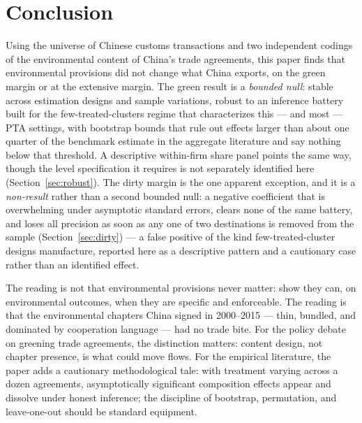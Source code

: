 \documentclass[12pt]{article}
\begin{document}
\section{Conclusion}\label{sec:conclusion}

Using the universe of Chinese customs transactions and two independent codings of the
environmental content of China's trade agreements, this paper finds that environmental
provisions did not change what China exports, on the green margin or at the extensive
margin. The green result is a \emph{bounded null}: stable across estimation designs and
sample variations, robust to an inference battery built for the few-treated-clusters
regime that characterizes this --- and most --- PTA settings, with bootstrap bounds that
rule out effects larger than about one quarter of the benchmark estimate in the aggregate
literature and say nothing below that threshold. A descriptive within-firm share panel
points the same way, though the level specification it requires is not separately
identified here (Section~\ref{sec:robust}). The dirty margin is the one apparent
exception, and it is a \emph{non-result} rather than a second bounded null: a negative
coefficient that is overwhelming under asymptotic standard errors, clears none of the same
battery, and loses all precision as soon as any one of two destinations is removed from the
sample (Section~\ref{sec:dirty}) --- a false
positive of the kind few-treated-cluster designs manufacture, reported here as a
descriptive pattern and a cautionary case rather than an identified effect.

The reading is not that environmental provisions never matter: \citet{abman2024} show
they can, on environmental outcomes, when they are specific and enforceable. The reading
is that the environmental chapters China signed in 2000--2015 --- thin, bundled, and
dominated by cooperation language --- had no trade bite. For the policy debate on
greening trade agreements, the distinction matters: content design, not chapter
presence, is what could move flows. For the empirical literature, the paper adds a
cautionary methodological tale: with treatment varying across a dozen agreements,
asymptotically significant composition effects appear and dissolve under honest
inference; the discipline of bootstrap, permutation, and leave-one-out should be
standard equipment.
\end{document}
